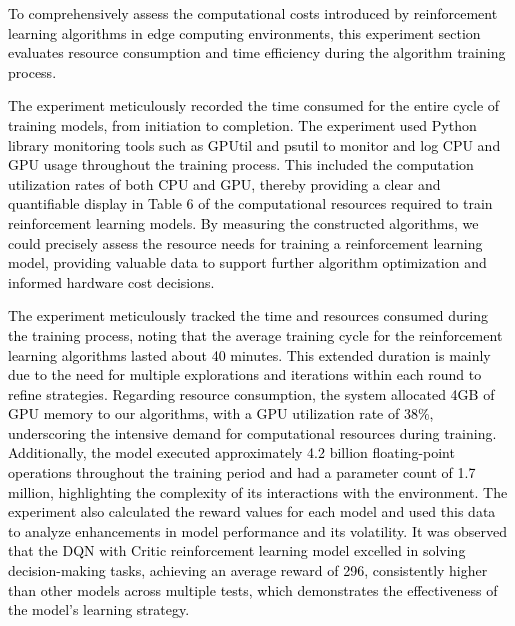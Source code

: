 \documentclass[preprint,12pt]{elsarticle}
\begin{document}
\textcolor{black}{To comprehensively assess the computational costs introduced by reinforcement learning algorithms in edge computing environments, this experiment section evaluates resource consumption and time efficiency during the algorithm training process.}

\textcolor{black}{The experiment meticulously recorded the time consumed for the entire cycle of training models, from initiation to completion. The experiment used Python library monitoring tools such as GPUtil and psutil to monitor and log CPU and GPU usage throughout the training process. This included the computation utilization rates of both CPU and GPU, thereby providing a clear and quantifiable display in Table 6 of the computational resources required to train reinforcement learning models. By measuring the constructed algorithms, we could precisely assess the resource needs for training a reinforcement learning model, providing valuable data to support further algorithm optimization and informed hardware cost decisions.}

\textcolor{black}{The experiment meticulously tracked the time and resources consumed during the training process, noting that the average training cycle for the reinforcement learning algorithms lasted about 40 minutes. This extended duration is mainly due to the need for multiple explorations and iterations within each round to refine strategies. Regarding resource consumption, the system allocated 4GB of GPU memory to our algorithms, with a GPU utilization rate of 38\%, underscoring the intensive demand for computational resources during training. Additionally, the model executed approximately 4.2 billion floating-point operations throughout the training period and had a parameter count of 1.7 million, highlighting the complexity of its interactions with the environment. The experiment also calculated the reward values for each model and used this data to analyze enhancements in model performance and its volatility. It was observed that the DQN with Critic reinforcement learning model excelled in solving decision-making tasks, achieving an average reward of 296, consistently higher than other models across multiple tests, which demonstrates the effectiveness of the model's learning strategy.}
\end{document}
